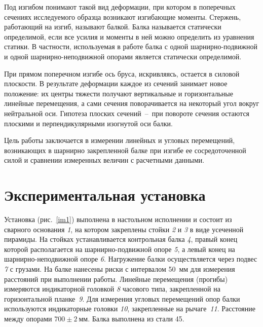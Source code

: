 \documentclass[12pt, a4paper]{article}
\begin{document}
    Под изгибом понимают такой вид деформации, при котором в поперечных сечениях исследуемого образца возникают изгибающие моменты. Стержень, работающий на изгиб, называют балкой. Балка называется статически определимой, если все усилия и моменты в ней можно определить из уравнения статики. В частности, используемая в работе балка с одной шарнирно-подвижной и одной шарнирно-неподвижной опорами является статически определимой.
    
    При прямом поперечном изгибе ось бруса, искривляясь, остается в силовой плоскости. В результате деформации каждое из сечений занимает новое положение: их центры тяжести получают вертикальные и горизонтальные линейные перемещения, а сами сечения поворачивается на некоторый угол вокруг нейтральной оси. Гипотеза плоских сечений~--~при повороте сечения остаются плоскими и перпендикулярными изогнутой оси балки.
    
    Цель работы заключается в измерении линейных и угловых перемещений, возникающих в шарнирно закрепленной балке при изгибе ее сосредоточенной силой и сравнении измеренных величин с расчетными данными.
    
    \newpage
    
    \section{Экспериментальная установка}
    
    Установка (рис.~\ref{im1}) выполнена в настольном исполнении и состоит из сварного основания \textit{1}, на котором закреплены стойки \textit{2} и \textit{3} в виде усеченной пирамиды. На стойках устанавливается контрольная балка \textit{4}, правый конец которой располагается на шарнирно-подвижной опоре \textit{5}, а левый конец на шарнирно-неподвижной опоре \textit{6}. Нагружение балки осуществляется через подвес \textit{7} с грузами. На балке нанесены риски с интервалом 50~мм для измерения расстояний при выполнении работы. Линейные перемещения (прогибы) измеряются индикаторной головкой \textit{8} часового типа, закрепленной на горизонтальной планке \textit{9}. Для измерения угловых перемещений опор балки используются индикаторные головки \textit{10}, закрепленные на рычаге \textit{11}. Расстояние между опорами $700 \pm 2~\text{мм}$. Балка выполнена из стали 45.
    
\end{document}
